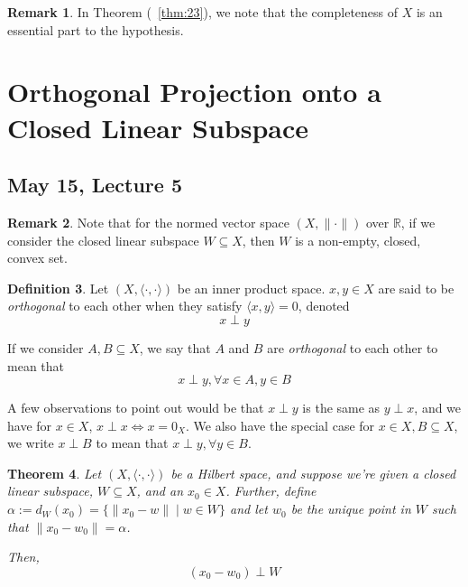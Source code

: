 \documentclass[11pt]{amsart}
\newtheorem{theorem}{Theorem}[section]
\theoremstyle{definition}
\newtheorem{definition}[theorem]{Definition}
\newtheorem{remark}[theorem]{Remark}
\numberwithin{equation}{section}
\newcommand{\bR}{ \mathbb{R} }	%
\newcommand{\ips}{ \left( X, \langle \cdot, \cdot \rangle \right) }		%
\newcommand{\nvs}{\left(X, \| \cdot \| \right)}					%
\begin{document}
\vspace{6pt}

\begin{remark}\label{rem:24} 
In Theorem (~\ref{thm:23}), we note that the completeness of $X$ is an essential part to the hypothesis. 
\end{remark}

\newpage

\section{Orthogonal Projection onto a Closed Linear Subspace}

\subsection{May 15, Lecture 5}

\vspace{6pt}

\begin{remark}\label{rem:31} 
Note that for the normed vector space $\nvs$ over $\bR$, if we consider the closed linear subspace $W \subseteq X$, then $W$ is a non-empty, closed, convex set. 
\end{remark}

\vspace{6pt}

\begin{definition}\label{def:32}
Let $\ips$ be an inner product space. $x,y \in X$ are said to be \textit{orthogonal} to each other when they satisfy $\langle x,y \rangle = 0$, denoted 
\[x \perp y \]

If we consider $A,B \subseteq X$, we say that $A$ and $B$ are \textit{orthogonal} to each other to mean that
\[x \perp y, \forall x \in A, y \in B \]
\end{definition}

\vspace{10pt}

A few observations to point out would be that $x \perp y$ is the same as $y \perp x$, and we have for $x \in X$, $x \perp x \Leftrightarrow x = 0_X$. We also have the special case for $x \in X, B \subseteq X$, we write $x \perp B$ to mean that $x \perp y, \forall y \in B$. 

\vspace{6pt}

\begin{theorem}\label{thm:33}
Let $\ips$ be a Hilbert space, and suppose we're given a closed linear subspace, $W \subseteq X$, and an $x_0 \in X$. Further, define $\alpha := d_W(x_0) = \{ \| x_0 - w \| \; | \; w \in W \}$ and let $w_0$ be the unique point in $W$ such that $\| x_0 - w_0 \| = \alpha$.

Then, 
\[\label{eq:OP-Perp} \tag{OP Perp}  (x_0 - w_0) \perp W\]
\end{theorem}
\end{document}
